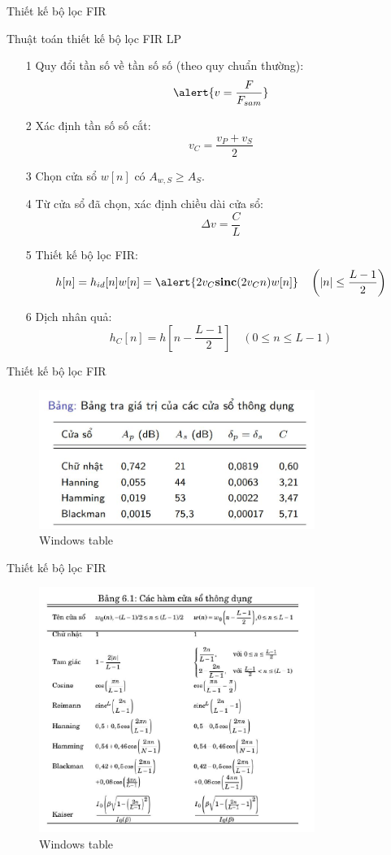 \documentclass[8pt]{beamer}
\begin{document}
\begin{frame}{Thiết kế bộ lọc FIR}
	\begin{block}{Thuật toán thiết kế bộ lọc FIR LP}
		\begin{enumerate}
			\item[1] Quy đổi tần số về \alert{tần số số} (theo quy chuẩn thường):
				$$\alert{v=\frac{F}{F_{sam}}}$$
			\item[2] Xác định tần số số cắt: $$v_{C}=\frac{v_{P}+v_{S}}{2}$$
			\item[3] Chọn cửa sổ $w[n]$ có $A_{w,S}\geq A_{S}$.
			\item[4] Từ cửa sổ đã chọn, xác định chiều dài cửa sổ: $$\Delta v=\frac{C}{L}$$
			\item[5] Thiết kế bộ lọc FIR: $$h[n]=h_{id}[n]w[n]=\alert{2v_{C}\textbf{sinc}(2v_{C}n)w[n]}\quad\left(|n|\leq\frac{L-1}{2}\right)$$
			\item[6] Dịch nhân quả:
				$$h_{C}[n]=h\left[n-\frac{L-1}{2}\right]\quad(0\leq n\leq L-1)$$
		\end{enumerate}
	\end{block}
\end{frame}
\begin{frame}{Thiết kế bộ lọc FIR}
	\begin{figure}[h]
		\includegraphics[width=0.8\textwidth]{8.jpg}
		\caption{Windows table}			\label{fig:re9}
	\end{figure}
\end{frame}
\begin{frame}{Thiết kế bộ lọc FIR}
	\begin{figure}[h]
		\includegraphics[width=0.8\textwidth]{9.jpg}
		\caption{Windows table}			\label{fig:re10}
	\end{figure}

\end{frame}
\end{document}

